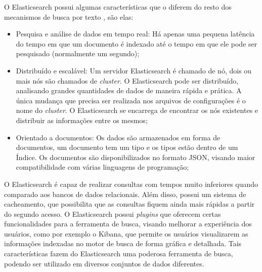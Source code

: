 O Elasticsearch possui algumas características que o diferem do resto dos mecanismos de busca por texto \cite{elastic}, são elas:
\begin{itemize}
    \item Pesquisa e análise de dados em tempo real: Há apenas uma pequena latência do tempo em que um documento é indexado até o tempo em que ele pode ser pesquisado (normalmente um segundo);
    \item Distribuído e escalável: Um servidor Elasticsearch é chamado de nó, dois ou mais nós são chamados de \textit{cluster}. O Elasticsearch pode ser distribuído, analisando grandes quantidades de dados de maneira rápida e prática. A única mudança que precisa ser realizada nos arquivos de configurações é o nome do \textit{cluster}. O Elasticsearch se encarrega de encontrar os nós existentes e distribuir as informações entre os mesmos;
    \item Orientado a documentos: Os dados são armazenados em forma de documentos, um documento tem um tipo e os tipos estão dentro de um Índice. Os documentos são disponibilizados no formato \gls{JSON}, visando maior compatibilidade com várias linguagens de programação;
\end{itemize}


O Elasticsearch é capaz de realizar consultas com tempos muito inferiores quando comparado aos bancos de dados relacionais. Além disso,  possui um sistema de cacheamento, que possibilita que as consultas fiquem ainda mais rápidas a partir do segundo acesso.
O Elasticsearch possui \textit{plugins} que oferecem certas funcionalidades para a ferramenta de busca, visando melhorar a experiência dos usuários, como por exemplo o Kibana, que permite os usuários visualizarem as informações indexadas no motor de busca de forma gráfica e detalhada.
Tais características fazem do Elasticsearch uma poderosa ferramenta de busca, podendo ser utilizado em diversos conjuntos de dados diferentes.

 










